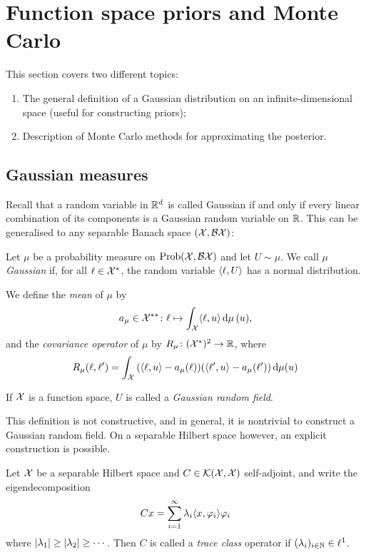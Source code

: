 \section{Function space priors and Monte Carlo}
This section covers two different topics: 
\begin{enumerate}
	\item The general definition of a Gaussian distribution on an infinite-dimensional space (useful for constructing priors);
	\item Description of Monte Carlo methods for approximating the posterior. 
\end{enumerate}
\subsection{Gaussian measures}
Recall that a random variable in $\mathbb R^d$ is called Gaussian if and only if every linear combination of its components is a Gaussian random variable on $\mathbb R$. This can be generalised to any separable Banach space $(\mathcal X, \mathcal B\mathcal X)$: 
\begin{definition}
	Let $\mu$ be a probability measure on $\operatorname{Prob}(\mathcal X, \mathcal B\mathcal X)$ and let $U \sim \mu$. We call $\mu$ \emph{Gaussian} if, for all $\ell \in \mathcal X^*$, the random variable $\langle\ell, U\rangle$ has a normal distribution.
	
	We define the \emph{mean} of $\mu$ by  
	\[
	a_\mu \in \mathcal X^{**} \colon \ell \mapsto \int_\mathcal X  \langle\ell, u\rangle \dd{\mu}(u),
	\]
	and the \emph{covariance operator} of $\mu$ by $R_\mu \colon (\mathcal X^*)^2 \to \mathbb R$, where 
	\[
	R_\mu(\ell, \ell') = \int_\mathcal X \qty(\langle\ell, u\rangle - a_\mu(\ell))(\langle\ell', u\rangle - a_\mu(\ell'))\dd{\mu(u)}
	\]
	
	If $\mathcal X$ is a function space, $U$ is called a \emph{Gaussian random field}. 
\end{definition}

This definition is not constructive, and in general, it is nontrivial to construct a Gaussian random field. On a separable Hilbert space however, an explicit construction is possible. 

\begin{definition}
	Let $\mathcal X$ be a separable Hilbert space and $C \in \mathcal K(\mathcal X, \mathcal X)$ self-adjoint, 
	and write the eigendecomposition
	\[
	Cx = \sum_{i=1}^\infty \lambda_i \langle x, \varphi_i\rangle \varphi_i
	\]
	where $\abs{\lambda_1} \geq \abs{\lambda_2} \geq \dotsb$. Then $C$ is called a \emph{trace class} operator if $(\lambda_i)_{i \in \mathbb N} \in \ell^1$. 
\end{definition}

